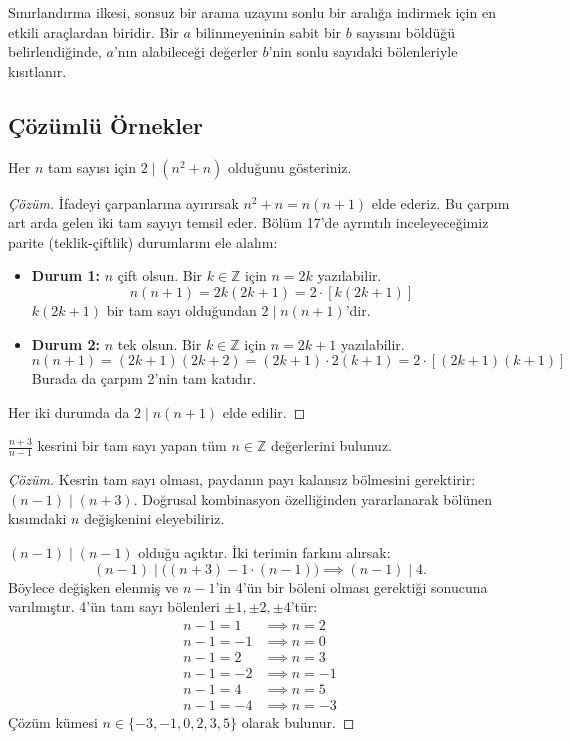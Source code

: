 Sınırlandırma ilkesi, sonsuz bir arama uzayını sonlu bir aralığa indirmek için en etkili araçlardan biridir. Bir $a$ bilinmeyeninin sabit bir $b$ sayısını böldüğü belirlendiğinde, $a$'nın alabileceği değerler $b$'nin sonlu sayıdaki bölenleriyle kısıtlanır.

\subsection{Çözümlü Örnekler}

\begin{example}
Her $n$ tam sayısı için $2 \mid (n^2 + n)$ olduğunu gösteriniz.
\end{example}

\begin{proof}[Çözüm]
İfadeyi çarpanlarına ayırırsak $n^2 + n = n(n+1)$ elde ederiz. Bu çarpım art arda gelen iki tam sayıyı temsil eder. Bölüm 17'de ayrıntılı inceleyeceğimiz parite (teklik-çiftlik) durumlarını ele alalım:
\begin{itemize}
    \item \textbf{Durum 1:} $n$ çift olsun. Bir $k \in \mathbb{Z}$ için $n = 2k$ yazılabilir.
    \[
    n(n+1) = 2k(2k+1) = 2 \cdot [k(2k+1)]
    \]
    $k(2k+1)$ bir tam sayı olduğundan $2 \mid n(n+1)$'dir.
    \item \textbf{Durum 2:} $n$ tek olsun. Bir $k \in \mathbb{Z}$ için $n = 2k+1$ yazılabilir.
    \[
    n(n+1) = (2k+1)(2k+2) = (2k+1) \cdot 2(k+1) = 2 \cdot [(2k+1)(k+1)]
    \]
    Burada da çarpım 2'nin tam katıdır.
\end{itemize}
Her iki durumda da $2 \mid n(n+1)$ elde edilir.
\end{proof}

\begin{example}
$\frac{n+3}{n-1}$ kesrini bir tam sayı yapan tüm $n \in \mathbb{Z}$ değerlerini bulunuz.
\end{example}

\begin{proof}[Çözüm]
Kesrin tam sayı olması, paydanın payı kalansız bölmesini gerektirir: $(n-1) \mid (n+3)$. Doğrusal kombinasyon özelliğinden yararlanarak bölünen kısımdaki $n$ değişkenini eleyebiliriz.

$(n-1) \mid (n-1)$ olduğu açıktır. İki terimin farkını alırsak:
\[
(n-1) \mid \Big( (n+3) - 1 \cdot (n-1) \Big) \implies (n-1) \mid 4.
\]
Böylece değişken elenmiş ve $n-1$'in 4'ün bir böleni olması gerektiği sonucuna varılmıştır. 4'ün tam sayı bölenleri $\pm 1, \pm 2, \pm 4$'tür:
\begin{align*}
n - 1 = 1 &\implies n = 2 \\
n - 1 = -1 &\implies n = 0 \\
n - 1 = 2 &\implies n = 3 \\
n - 1 = -2 &\implies n = -1 \\
n - 1 = 4 &\implies n = 5 \\
n - 1 = -4 &\implies n = -3
\end{align*}
Çözüm kümesi $n \in \{-3, -1, 0, 2, 3, 5\}$ olarak bulunur.
\end{proof}

